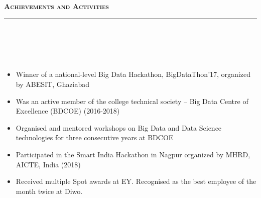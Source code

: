 \documentclass[a4paper,10pt]{article}
\newcommand{\isep}{-2 pt}
\newcommand{\lsep}{-0.5cm}
\newcommand{\resheading}[1]{{\small
        {
            \begin{minipage}
                {0.992\textwidth}\textbf{{\textsc{#1 \vphantom{p\^{E}} }}}
                \\[-0.3cm]
                \hrule
            \end{minipage}
            \\[-0.5cm]
        }
 }}
\begin{document}
\vspace{2pt}
\noindent
\resheading{\textbf{\large Achievements and Activities}}\\[\lsep] 
\\[-0.3cm]
\begin{itemize}\itemsep \isep

\item Winner of a national-level Big Data Hackathon, BigDataThon'17, organized by ABESIT, Ghaziabad

\item Was an active member of the college technical society -- Big Data Centre of Excellence (BDCOE) (2016-2018)

\item Organised and mentored workshops on Big Data and Data Science technologies for three consecutive years at BDCOE

\item Participated in the Smart India Hackathon in Nagpur organized by MHRD, AICTE, India (2018)


\item Received multiple Spot awards at EY. Recognised as the best employee of the month twice at Diwo.


    
	
\end{itemize}
\end{document}
